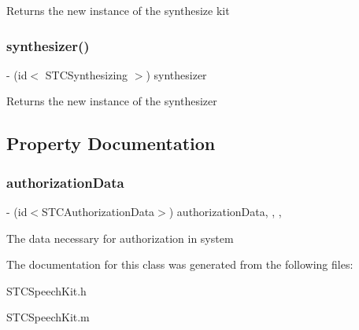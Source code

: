 Returns the new instance of the synthesize kit \hypertarget{interface_s_t_c_speech_kit_a10aeaaaa028124b2238619b7fcf1ee27}{}\label{interface_s_t_c_speech_kit_a10aeaaaa028124b2238619b7fcf1ee27} 
\subsubsection{\texorpdfstring{synthesizer()}{synthesizer()}}
{\footnotesize\ttfamily -\/ (id$<$ S\+T\+C\+Synthesizing $>$) synthesizer \begin{DoxyParamCaption}{ }\end{DoxyParamCaption}}

Returns the new instance of the synthesizer 

\subsection{Property Documentation}
\hypertarget{interface_s_t_c_speech_kit_acb1dabce194bf1a3a4bfdf5144537cf6}{}\label{interface_s_t_c_speech_kit_acb1dabce194bf1a3a4bfdf5144537cf6} 
\subsubsection{\texorpdfstring{authorization\+Data}{authorizationData}}
{\footnotesize\ttfamily -\/ (id$<$S\+T\+C\+Authorization\+Data$>$) authorization\+Data\hspace{0.3cm}{\ttfamily [read]}, {\ttfamily [write]}, {\ttfamily [nonatomic]}, {\ttfamily [assign]}}

The data necessary for authorization in system 

The documentation for this class was generated from the following files\+:\begin{DoxyCompactItemize}
\item 
S\+T\+C\+Speech\+Kit.\+h\item 
S\+T\+C\+Speech\+Kit.\+m\end{DoxyCompactItemize}
